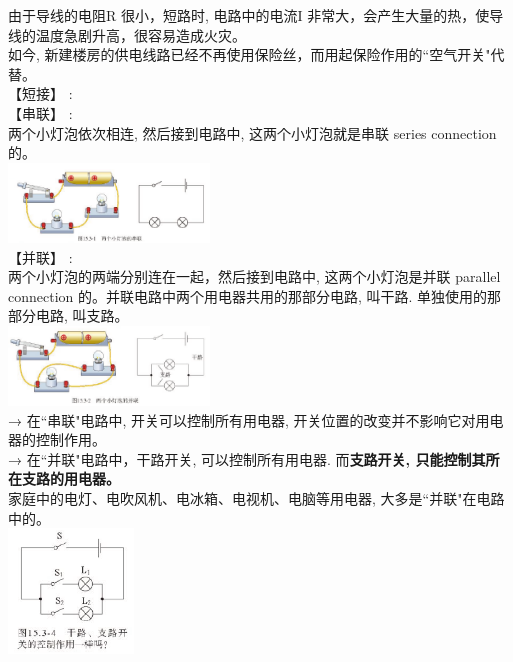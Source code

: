 \documentclass[UTF8]{ctexart}
\begin{document}
	由于导线的电阻R 很小，短路时, 电路中的电流I 非常大，会产生大量的热，使导线的温度急剧升高，很容易造成火灾。 \\
	如今,	新建楼房的供电线路已经不再使用保险丝，而用起保险作用的``空气开关"代替。 \\
	
		
	【短接】 : \\
	
	
	【串联】 : \\
	两个小灯泡依次相连, 然后接到电路中, 这两个小灯泡就是串联 series connection 的。 \\
	
	\includegraphics[width=0.4\textwidth]{img/0053.png} \\			
	
	【并联】 : \\
	两个小灯泡的两端分别连在一起，然后接到电路中, 这两个小灯泡是并联 parallel  connection 的。并联电路中两个用电器共用的那部分电路, 叫干路. 单独使用的那部分电路, 叫支路。 \\
	
	\includegraphics[width=0.4\textwidth]{img/0054.png} \\
	
	
	→ 在``串联"电路中, 开关可以控制所有用电器, 开关位置的改变并不影响它对用电器的控制作用。 \\
	→ 在``并联"电路中，干路开关, 可以控制所有用电器. 而\textbf{支路开关, 只能控制其所在支路的用电器。} \\
	家庭中的电灯、电吹风机、电冰箱、电视机、电脑等用电器, 大多是``并联"在电路中的。 \\	
	
	\includegraphics[width=0.25\textwidth]{img/0055.png} \\	
	
\end{document}
